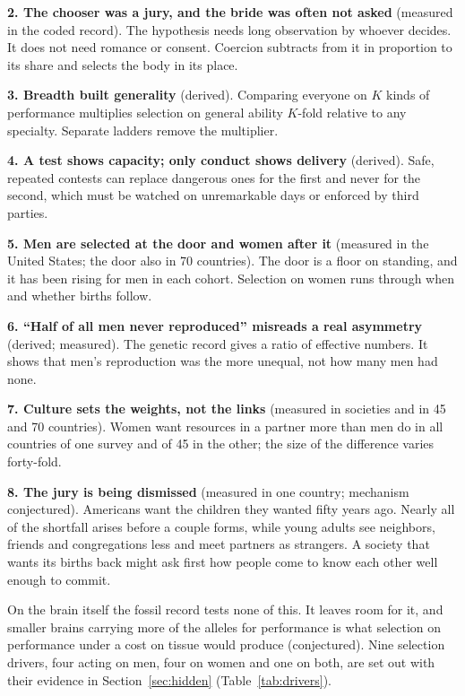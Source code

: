 \textbf{2. The chooser was a jury, and the bride was often not asked} (measured in the coded record). The hypothesis needs
long observation by whoever decides. It does not need romance or consent. Coercion subtracts from it in proportion to its
share and selects the body in its place.

\textbf{3. Breadth built generality} (derived). Comparing everyone on $K$ kinds of performance multiplies selection on
general ability $K$-fold relative to any specialty. Separate ladders remove the multiplier.

\textbf{4. A test shows capacity; only conduct shows delivery} (derived). Safe, repeated contests can replace dangerous
ones for the first and never for the second, which must be watched on unremarkable days or enforced by third parties.

\textbf{5. Men are selected at the door and women after it} (measured in the United States; the door also in 70
countries). The door is a floor on standing, and it has been rising for men in each cohort. Selection on women runs
through when and whether births follow.

\textbf{6. ``Half of all men never reproduced'' misreads a real asymmetry} (derived; measured). The genetic record gives a
ratio of effective numbers. It shows that men's reproduction was the more unequal, not how many men had none.

\textbf{7. Culture sets the weights, not the links} (measured in \CcSccsN{} societies and in 45 and 70 countries). Women
want resources in a partner more than men do in all \WdResPos{} countries of one survey and \WtResPos{} of 45 in the
other; the size of the difference varies forty-fold.

\textbf{8. The jury is being dismissed} (measured in one country; mechanism conjectured). Americans want the children they
wanted fifty years ago. Nearly all of the shortfall arises before a couple forms, while young adults see neighbors,
friends and congregations less and meet partners as strangers. A society that wants its births back might ask first how
people come to know each other well enough to commit.

On the brain itself the fossil record tests none of this. It leaves room for it, and smaller brains carrying more of the
alleles for performance is what selection on performance under a cost on tissue would produce (conjectured). Nine
selection drivers, four acting on men, four on women and one on both, are set out with their evidence in
Section~\ref{sec:hidden} (Table~\ref{tab:drivers}).

